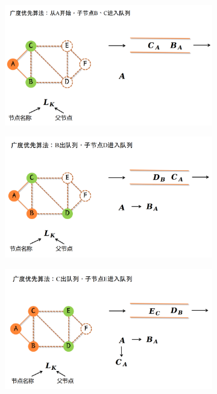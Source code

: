\documentclass[../main.tex]{subfiles}
\begin{document}
\begin{enumerate}
        \begin{figure}[H]
            \centering
            \begin{subfigure}[b]{0.32\textwidth}
                \includegraphics[width=\textwidth]{images/BFS/1.png}
            \end{subfigure}
            \begin{subfigure}[b]{0.32\textwidth}
                \includegraphics[width=\textwidth]{images/BFS/2.png}
            \end{subfigure}
            \begin{subfigure}[b]{0.32\textwidth}
                \includegraphics[width=\textwidth]{images/BFS/3.png}

\end{subfigure}
\end{figure}
\end{enumerate}
\end{document}
